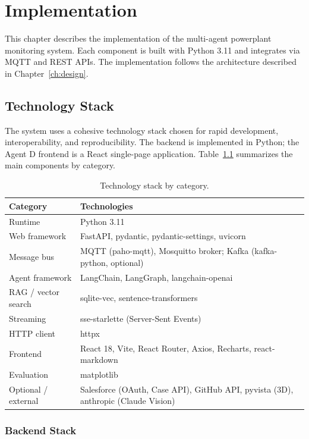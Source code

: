 \documentclass[12pt,letterpaper]{report}
\begin{document}
\chapter{Implementation}
\label{ch:impl}

This chapter describes the implementation of the multi-agent powerplant monitoring system. Each component is built with Python 3.11 and integrates via MQTT and REST APIs. The implementation follows the architecture described in Chapter~\ref{ch:design}.

\section{Technology Stack}

The system uses a cohesive technology stack chosen for rapid development, interoperability, and reproducibility. The backend is implemented in Python; the Agent D frontend is a React single-page application. Table~\ref{tab:tech} summarizes the main components by category.

\begin{table}[htbp]
\centering
\caption{Technology stack by category.}
\label{tab:tech}
\begin{tabular}{ll}
\toprule
\textbf{Category} & \textbf{Technologies} \\
\midrule
Runtime & Python 3.11 \\
Web framework & FastAPI, pydantic, pydantic-settings, uvicorn \\
Message bus & MQTT (paho-mqtt), Mosquitto broker; Kafka (kafka-python, optional) \\
Agent framework & LangChain, LangGraph, langchain-openai \\
RAG / vector search & sqlite-vec, sentence-transformers \\
Streaming & sse-starlette (Server-Sent Events) \\
HTTP client & httpx \\
Frontend & React 18, Vite, React Router, Axios, Recharts, react-markdown \\
Evaluation & matplotlib \\
Optional / external & Salesforce (OAuth, Case API), GitHub API, pyvista (3D), anthropic (Claude Vision) \\
\bottomrule
\end{tabular}
\end{table}

\subsection{Backend Stack}
\end{document}
